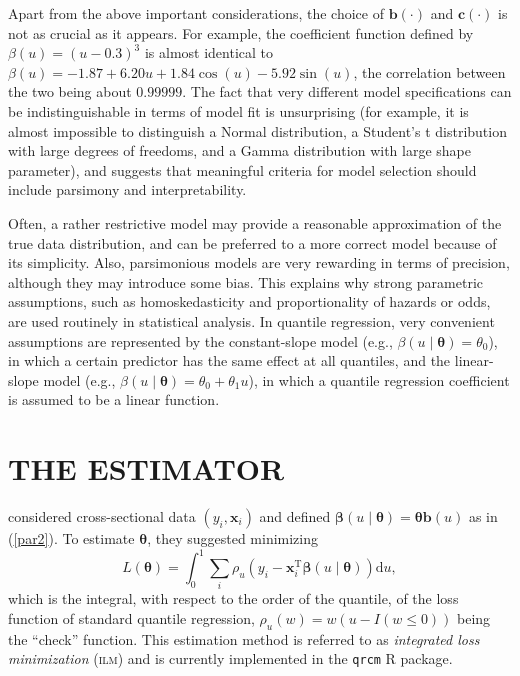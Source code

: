 \documentclass[12pt]{article}
\def\T{{ \mathrm{\scriptscriptstyle T} }}
\def\ILM{\textsc{ilm}}
\def\thetavec{\bm{\theta}}
\def\phivec{\bm{\phi}}
\def\betavec{\bm{\beta}}
\def\xx{\bm{x}}
\def\zz{\bm{z}}
\def\bvec{\bm{b}}
\def\cvec{\bm{c}}
\begin{document}
Apart from the above important considerations, the choice of $\bvec(\cdot)$
and $\cvec(\cdot)$ is not as crucial as it appears. For example, 
the coefficient function defined by $\beta(u) = (u - 0.3)^3$ is almost identical to $\beta(u) = -1.87 + 6.20u + 1.84\cos(u) - 5.92\sin(u)$,
the correlation between the two being about $0.99999$. The fact that very different model specifications can be indistinguishable in terms of model fit
is unsurprising (for example, it is almost impossible to distinguish a Normal distribution, a Student's t distribution with large degrees of freedoms, 
and a Gamma distribution with large shape parameter), and suggests that meaningful criteria for model selection should include parsimony 
and interpretability.

Often, a rather restrictive model may provide a reasonable approximation of the true data distribution, 
and can be preferred to a more correct model because of its simplicity. Also, parsimonious models are very
rewarding in terms of precision, although they may introduce some bias. This explains why
strong parametric assumptions, such as homoskedasticity and proportionality of hazards or odds, 
are used routinely in statistical analysis. In quantile regression, very convenient assumptions are represented by the constant-slope 
model (e.g., $\beta(u \mid \thetavec) = \theta_0$), in which a certain predictor has the same effect at all quantiles, and the
linear-slope model (e.g., $\beta(u \mid \thetavec) = \theta_0 + \theta_1u$), in which a quantile regression coefficient is assumed to be a linear function.






\section{THE ESTIMATOR}\label{sec:est}

\cite{iqr} considered cross-sectional data $(y_i, \xx_i)$ and defined $\betavec(u\mid\thetavec) = \thetavec\bvec(u)$
as in (\ref{par2}). To estimate $\thetavec$, they suggested minimizing
\begin{equation}\label{iloss}
	L(\thetavec) = \int_0^1{\sum_i{\rho_u(y_i - \xx_i^\T\betavec(u \mid \thetavec))} \mathrm{d}u},
\end{equation}
which is the integral, with respect to the order of the quantile, of the loss function of standard
quantile regression, $\rho_u(w) = w(u - I(w \le 0))$ being the ``check'' function. 
This estimation method is referred to as \textit{integrated loss minimization} (\ILM) 
and is currently implemented in the \texttt{qrcm} R package. 
\end{document}
